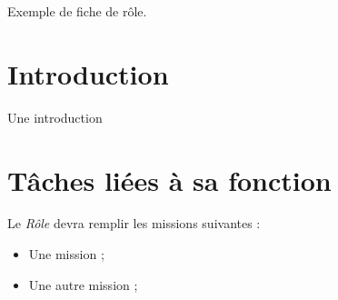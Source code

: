 
Exemple de fiche de rôle.
\section*{Introduction}


Une introduction


\section*{Tâches liées à sa fonction}

Le \textit{Rôle} devra remplir les missions suivantes :
\begin{itemize}
	\item Une mission ;
	\item Une autre mission ;

\end{itemize}
